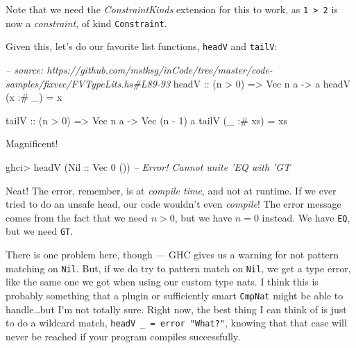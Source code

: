 \documentclass[]{article}
\newenvironment{Shaded}{}{}
\newcommand{\DataTypeTok}[1]{\textcolor[rgb]{0.56,0.13,0.00}{{#1}}}
\newcommand{\DecValTok}[1]{\textcolor[rgb]{0.25,0.63,0.44}{{#1}}}
\newcommand{\CommentTok}[1]{\textcolor[rgb]{0.38,0.63,0.69}{\textit{{#1}}}}
\newcommand{\OtherTok}[1]{\textcolor[rgb]{0.00,0.44,0.13}{{#1}}}
\newcommand{\FunctionTok}[1]{\textcolor[rgb]{0.02,0.16,0.49}{{#1}}}
\newcommand{\NormalTok}[1]{{#1}}
\begin{document}
Note that we need the \emph{ConstraintKinds} extension for this to work,
as \texttt{1\ \textgreater{}\ 2} is now a \emph{constraint}, of kind
\texttt{Constraint}.

Given this, let's do our favorite list functions, \texttt{headV} and
\texttt{tailV}:

\begin{Shaded}
\begin{Highlighting}[]
\CommentTok{-- source: https://github.com/mstksg/inCode/tree/master/code-samples/fixvec/FVTypeLits.hs#L89-93}
\OtherTok{headV ::} \NormalTok{(n }\FunctionTok{>} \DecValTok{0}\NormalTok{) }\OtherTok{=>} \DataTypeTok{Vec} \NormalTok{n a }\OtherTok{->} \NormalTok{a}
\NormalTok{headV (x }\FunctionTok{:#} \NormalTok{_)  }\FunctionTok{=} \NormalTok{x}

\OtherTok{tailV ::} \NormalTok{(n }\FunctionTok{>} \DecValTok{0}\NormalTok{) }\OtherTok{=>} \DataTypeTok{Vec} \NormalTok{n a }\OtherTok{->} \DataTypeTok{Vec} \NormalTok{(n }\FunctionTok{-} \DecValTok{1}\NormalTok{) a}
\NormalTok{tailV (_ }\FunctionTok{:#} \NormalTok{xs) }\FunctionTok{=} \NormalTok{xs}
\end{Highlighting}
\end{Shaded}

Magnificent!

\begin{Shaded}
\begin{Highlighting}[]
\NormalTok{ghci}\FunctionTok{>} \NormalTok{headV (}\DataTypeTok{Nil}\OtherTok{ ::} \DataTypeTok{Vec} \DecValTok{0} \NormalTok{())}
\CommentTok{-- Error!  Cannot unite 'EQ with 'GT}
\end{Highlighting}
\end{Shaded}

Neat! The error, remember, is at \emph{compile time}, and not at
runtime. If we ever tried to do an unsafe head, our code wouldn't even
\emph{compile}! The error message comes from the fact that we need
\(n > 0\), but we have \(n = 0\) instead. We have \texttt{EQ}, but we
need \texttt{GT}.

There is one problem here, though --- GHC gives us a warning for not
pattern matching on \texttt{Nil}. But, if we do try to pattern match on
\texttt{Nil}, we get a type error, like the same one we got when using
our custom type nats. I think this is probably something that a plugin
or sufficiently smart \texttt{CmpNat} might be able to handle\ldots{}but
I'm not totally sure. Right now, the best thing I can think of is just
to do a wildcard match, \texttt{headV\ \_\ =\ error\ "What?"}, knowing
that that case will never be reached if your program compiles
successfully.
\end{document}
